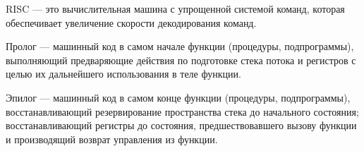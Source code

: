 RISC --- это вычислительная машина с упрощенной системой команд, которая обеспечивает увеличение скорости декодирования команд. \cite{it_dict}

Пролог --- машинный код в самом начале функции (процедуры, подпрограммы), выполняющий предваряющие действия по подготовке стека потока и регистров с целью их дальнейшего использования в теле функции.

Эпилог --- машинный код в самом конце функции (процедуры, подпрограммы), восстанавливающий резервирование пространства стека до начального состояния; восстанавливающий регистры до состояния, предшествовавшего вызову функции и производящий возврат управления из функции.


\pagebreak